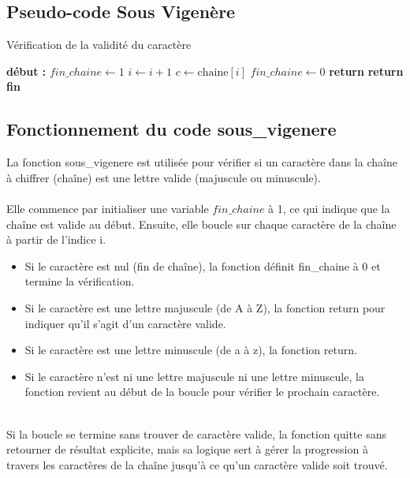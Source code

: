 \documentclass[a4paper, 12pt]{article}
\begin{document}
\newpage

\subsection{Pseudo-code Sous Vigenère}
\begin{algorithm}
\caption{Vérification de la validité du caractère}
\begin{algorithmic}[1]
\State \textbf{début :}
\State $fin\_chaine \gets 1$
    \State $i \gets i + 1$ 
    \State $c \gets \text{chaine}[i]$
        \State $fin\_chaine \gets 0$
    \EndIf
        \State \textbf{return}
        \State \textbf{return}
    \EndIf
\EndWhile
\State \textbf{fin}
\end{algorithmic}
\end{algorithm}

\subsection{Fonctionnement du code sous\_vigenere}

La fonction sous\_vigenere est utilisée pour vérifier si un caractère dans la chaîne à chiffrer (chaîne) est une lettre valide (majuscule ou minuscule).
\\
\\
Elle commence par initialiser une variable $fin\_chaine$ à 1, ce qui indique que la chaîne est valide au début. Ensuite, elle boucle sur chaque caractère de la chaîne à partir de l'indice i.
\\
\begin{itemize}
    \item Si le caractère est nul (fin de chaîne), la fonction définit fin\_chaine à 0 et termine la vérification.
    \item Si le caractère est une lettre majuscule (de A à Z), la fonction return pour indiquer qu'il s'agit d'un caractère valide.
    \item Si le caractère est une lettre minuscule (de a à z), la fonction return.
    \item Si le caractère n'est ni une lettre majuscule ni une lettre minuscule, la fonction revient au début de la boucle pour vérifier le prochain caractère.
\end{itemize}
\\
Si la boucle se termine sans trouver de caractère valide, la fonction quitte sans retourner de résultat explicite, mais sa logique sert à gérer la progression à travers les caractères de la chaîne jusqu'à ce qu'un caractère valide soit trouvé.
\end{document}
